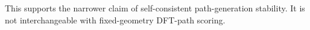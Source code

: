 This supports the narrower claim of self-consistent path-generation stability. It is not interchangeable with fixed-geometry DFT-path scoring.
